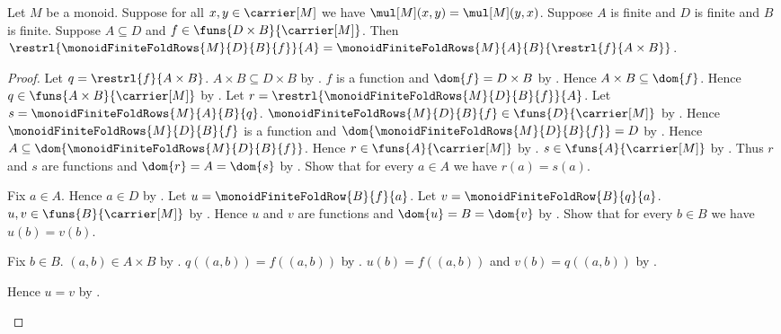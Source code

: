 \begin{lemma}\label{monoid_finite_fold_rows_restriction}
    Let $M$ be a monoid.
    Suppose for all $x,y\in\carrier[M]$ we have
        $\mul[M](x,y)=\mul[M](y,x)$.
    Suppose $A$ is finite and $D$ is finite and $B$ is finite.
    Suppose $A\subseteq D$ and
        $f\in\funs{D\times B}{\carrier[M]}$.
    Then
        $\restrl{\monoidFiniteFoldRows{M}{D}{B}{f}}{A}
        =\monoidFiniteFoldRows{M}{A}{B}{
            \restrl{f}{A\times B}}$.
\end{lemma}
\begin{proof}
    Let $q=\restrl{f}{A\times B}$.
    $A\times B\subseteq D\times B$ by
        .
    $f$ is a function and $\dom{f}=D\times B$ by
        .
    Hence $A\times B\subseteq\dom{f}$.
    Hence $q\in\funs{A\times B}{\carrier[M]}$ by
        .
    Let $r=\restrl{\monoidFiniteFoldRows{M}{D}{B}{f}}{A}$.
    Let $s=\monoidFiniteFoldRows{M}{A}{B}{q}$.
    $\monoidFiniteFoldRows{M}{D}{B}{f}
        \in\funs{D}{\carrier[M]}$ by
        .
    Hence $\monoidFiniteFoldRows{M}{D}{B}{f}$ is a function and
        $\dom{\monoidFiniteFoldRows{M}{D}{B}{f}}=D$ by
        .
    Hence $A\subseteq
        \dom{\monoidFiniteFoldRows{M}{D}{B}{f}}$.
    Hence $r\in\funs{A}{\carrier[M]}$ by
        .
    $s\in\funs{A}{\carrier[M]}$ by
        .
    Thus $r$ and $s$ are functions and $\dom{r}=A=\dom{s}$ by
        .
    Show that for every $a\in A$ we have $r(a)=s(a)$.
    \begin{subproof}
        Fix $a\in A$.
        Hence $a\in D$ by .
        Let $u=\monoidFiniteFoldRow{B}{f}{a}$.
        Let $v=\monoidFiniteFoldRow{B}{q}{a}$.
        $u,v\in\funs{B}{\carrier[M]}$ by
            .
        Hence $u$ and $v$ are functions and $\dom{u}=B=\dom{v}$ by
            .
        Show that for every $b\in B$ we have $u(b)=v(b)$.
        \begin{subproof}
            Fix $b\in B$.
            $(a,b)\in A\times B$ by .
            $q((a,b))=f((a,b))$ by
                .
            $u(b)=f((a,b))$ and $v(b)=q((a,b))$ by
                .
        \end{subproof}
        Hence $u=v$ by .

\end{subproof}
\end{proof}
